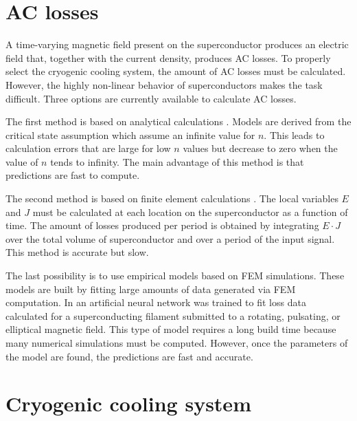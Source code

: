 \documentclass{ws-jmrr}
\begin{document}
\begin{multicols}{2}
\section{AC losses}
\label{ac}
A time-varying magnetic field present on the superconductor produces an electric field that, together with the current density, produces AC losses. To properly select the cryogenic cooling system, the amount of AC losses must be calculated. However, the highly non-linear behavior of superconductors makes the task difficult. Three options are currently available to calculate AC losses.\par
 The first method is based on analytical calculations \cite{0022-3727-3-4-308}. Models are derived from the critical state assumption which assume an infinite value for $n$. 
 This leads to calculation errors that are large for low $n$ values but decrease to zero when the value of $n$ tends to infinity. 
 The main advantage of this method is that predictions are fast to compute.\par
The second method is based on finite element calculations \cite{brambilla2006development}. 
 The local variables $E$ and $J$ must be calculated at each location on the superconductor as a function of time. 
  The amount of losses produced per period is obtained by integrating $E\cdot J$ over the total volume of superconductor and over a period of the input signal. 
  This method is accurate but slow.\par
The last possibility is to use empirical models based on FEM simulations. 
 These models are built by fitting large amounts of data generated via FEM computation. 
  In \cite{leclerc2016artificial} an artificial neural network was trained to fit loss data calculated for a superconducting filament submitted to a rotating, pulsating, or elliptical magnetic field. 
   This type of model requires a long build time because many numerical simulations must be computed. However, once the parameters of the model are found, the predictions are fast and accurate.

\section{Cryogenic cooling system}


\end{multicols}
\end{document}
